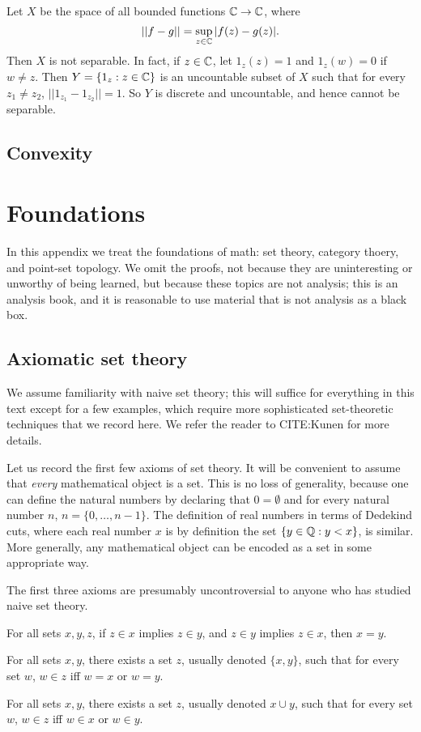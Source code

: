 \begin{example}
\label{nonseparable space}
Let $X$ be the space of all bounded functions $\mathbb{C} \to \mathbb{C}$, where
$$||f - g|| = \sup_{z \in \mathbb{C}}|f(z) - g(z)|.$$
Then $X$ is not separable. In fact, if $z \in \mathbb{C}$, let $1_z(z) = 1$ and $1_z(w) = 0$ if $w \neq z$.
Then $Y=\{1_z: z \in \mathbb{C}\}$ is an uncountable subset of $X$ such that for every $z_1 \neq z_2$, $||1_{z_1} - 1_{z_2}|| =1$.
So $Y$ is discrete and uncountable, and hence cannot be separable.
\end{example}

\section{Convexity}



\chapter{Foundations}
In this appendix we treat the foundations of math: set theory, category thoery, and point-set topology.
We omit the proofs, not because they are uninteresting or unworthy of being learned, but because these topics are not analysis; this is an analysis book, and it is reasonable to use material that is not analysis as a black box.

\section{Axiomatic set theory}
We assume familiarity with naive set theory; this will suffice for everything in this text except for a few examples, which require more sophisticated set-theoretic techniques that we record here.
We refer the reader to CITE:Kunen for more details.

Let us record the first few axioms of set theory.
It will be convenient to assume that \emph{every} mathematical object is a set.
This is no loss of generality, because one can define the natural numbers by declaring that $0 = \emptyset$ and for every natural number $n$, $n = \{0, \dots, n - 1\}$.
The definition of real numbers in terms of Dedekind cuts, where each real number $x$ is by definition the set $\{y \in \mathbb{Q}: y < x\}$, is similar.
More generally, any mathematical object can be encoded as a set in some appropriate way.

The first three axioms are presumably uncontroversial to anyone who has studied naive set theory.

\begin{axiom}[extensionality]
For all sets $x, y, z$, if $z \in x$ implies $z \in y$, and $z \in y$ implies $z \in x$, then $x = y$.
\end{axiom}
\begin{axiom}[pairing]
For all sets $x, y$, there exists a set $z$, usually denoted $\{x, y\}$, such that for every set $w$, $w \in z$ iff $w = x$ or $w = y$.
\end{axiom}
\begin{axiom}[union]
For all sets $x, y$, there exists a set $z$, usually denoted $x \cup y$, such that for every set $w$, $w \in z$ iff $w \in x$ or $w \in y$.
\end{axiom}

